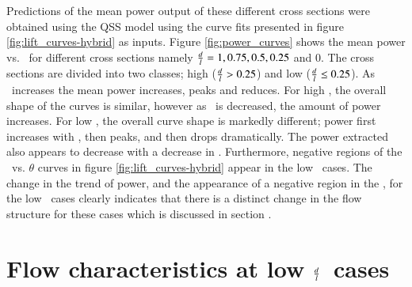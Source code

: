 Predictions of the mean power output of these different cross sections were obtained using the QSS model using the curve fits presented in figure \ref{fig:lift_curves-hybrid} as inputs. Figure \ref{fig:power_curves} shows the mean power vs. \massdamp\ for different cross sections namely $\frac{d}{l}=1,0.75,0.5,0.25$ and $0$. The cross sections are divided into two classes; high ($\frac{d}{l} > 0.25$) and low ($\frac{d}{l} \leq 0.25$). As \massdamp\ increases the mean power increases, peaks and reduces. For high \ratio, the overall shape of the curves is similar, however as \ratio\ is decreased, the amount of power increases. For low \ratio, the overall curve shape is markedly different; power first increases with \massdamp, then peaks, and then drops dramatically. The power extracted also appears to decrease with a decrease in \ratio. Furthermore, negative regions of the \cy\ vs. $\theta$ curves in figure \ref{fig:lift_curves-hybrid} appear in the low \ratio\ cases. The change in the trend of power, and the appearance of a negative region in the \cy, for the low \ratio\ cases clearly indicates that there is a distinct change in the flow structure for these cases which is discussed in section \label{sec:negative-region}.
 
\section{Flow characteristics at low $\frac{d}{l}$\ cases} 
 
  
 
 
 
 
 
 

 
 
 
 
 
 
 
 
 
 
 